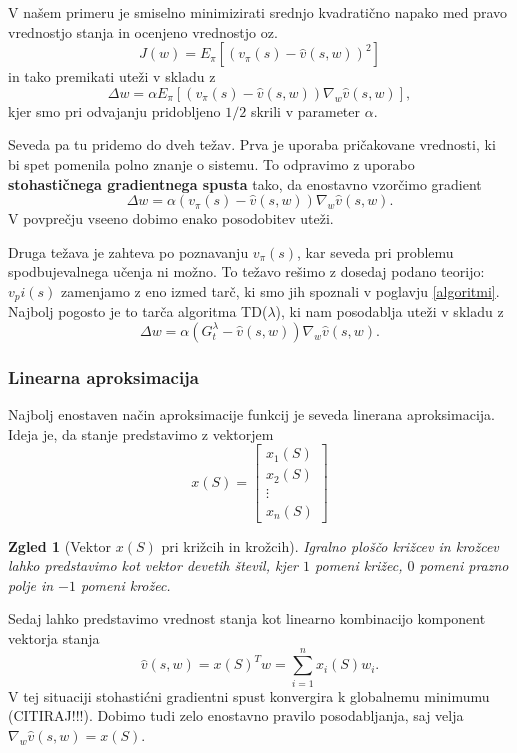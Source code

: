 \documentclass[12pt,a4paper]{amsart}
\theoremstyle{definition} %
\theoremstyle{plain} %
\newtheorem{zgled}[definicija]{Zgled}
\begin{document}
V našem primeru je smiselno minimizirati srednjo kvadratično napako med pravo vrednostjo stanja in 
ocenjeno vrednostjo oz. 
$$
J(w) = E_\pi [(v_\pi(s) - \hat{v}(s, w))^2]
$$
in tako premikati uteži v skladu z 
$$
\Delta w = \alpha E_\pi [(v_\pi(s) - \hat{v}(s, w)) \nabla_w \hat{v}(s, w)], 
$$
kjer smo pri odvajanju pridobljeno $1/2$ skrili v parameter $\alpha$.

Seveda pa tu pridemo do dveh težav. Prva je uporaba pričakovane vrednosti, ki bi spet pomenila polno 
znanje o sistemu. To odpravimo z uporabo \textbf{stohastičnega gradientnega spusta} tako, da 
enostavno vzorčimo gradient 
$$
\Delta w = \alpha (v_\pi(s) - \hat{v}(s, w)) \nabla_w \hat{v}(s, w). 
$$
V povprečju vseeno dobimo enako posodobitev uteži. 

Druga težava je zahteva po poznavanju $v_\pi(s)$, kar seveda pri problemu spodbujevalnega učenja ni 
možno. To težavo rešimo z dosedaj podano teorijo: $v_pi(s)$ zamenjamo z eno izmed tarč, ki smo jih 
spoznali v poglavju \ref{algoritmi}. Najbolj pogosto je to tarča algoritma TD($\lambda$), ki nam 
posodablja uteži v skladu z 
$$
\Delta w = \alpha (G_t^\lambda - \hat{v}(s, w)) \nabla_w \hat{v}(s, w). 
$$

\subsubsection{Linearna aproksimacija}
Najbolj enostaven način aproksimacije funkcij je seveda linerana aproksimacija. Ideja je, da stanje 
predstavimo z vektorjem 
$$
x(S) = \begin{bmatrix}
    x_{1}(S) \\
    x_{2}(S) \\
    \vdots \\
    x_{n}(S)
  \end{bmatrix}
$$

\begin{zgled}[Vektor $x(S)$ pri križcih in krožcih]
    Igralno ploščo križcev in krožcev lahko predstavimo kot vektor devetih števil, kjer 
    $1$ pomeni križec, $0$ pomeni prazno polje in $-1$ pomeni krožec.
\end{zgled}

Sedaj lahko predstavimo vrednost stanja kot linearno kombinacijo komponent vektorja stanja
$$
\hat{v}(s, w) = x(S)^T w = \sum_{i=1}^n x_i(S) w_i.
$$
V tej situaciji stohastićni gradientni spust konvergira k globalnemu minimumu (CITIRAJ!!!). Dobimo 
tudi zelo enostavno pravilo posodabljanja, saj velja $\nabla_w \hat{v}(s, w) = x(S)$.
\end{document}

